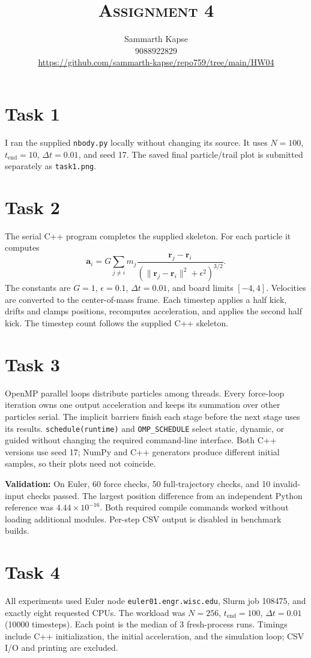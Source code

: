 \documentclass[a4paper]{article}
\title{\textsc{Assignment 4}}
\author{Sammarth Kapse \\ 9088922829 \\
\url{https://github.com/sammarth-kapse/repo759/tree/main/HW04}}
\date{}
\begin{document}
\maketitle

\section*{Task 1}
I ran the supplied \texttt{nbody.py} locally without changing its source. It uses
$N=100$, $t_{\mathrm{end}}=10$, $\Delta t=0.01$, and seed 17. The saved final
particle/trail plot is submitted separately as \texttt{task1.png}.

\section*{Task 2}
The serial C++ program completes the supplied skeleton. For each particle it computes
\[
 \mathbf a_i=G\sum_{j\ne i}m_j
 \frac{\mathbf r_j-\mathbf r_i}
 {(\|\mathbf r_j-\mathbf r_i\|^2+\epsilon^2)^{3/2}}.
\]
The constants are $G=1$, $\epsilon=0.1$, $\Delta t=0.01$, and board limits $[-4,4]$.
Velocities are converted to the center-of-mass frame. Each timestep applies a half kick,
drifts and clamps positions, recomputes acceleration, and applies the second half kick.
The timestep count follows the supplied C++ skeleton.

\section*{Task 3}
OpenMP parallel loops distribute particles among threads. Every force-loop iteration
owns one output acceleration and keeps its summation over other particles serial.
The implicit barriers finish each stage before the next stage uses its results.
\texttt{schedule(runtime)} and \texttt{OMP\_SCHEDULE} select static, dynamic, or guided
without changing the required command-line interface. Both C++ versions use seed 17;
NumPy and C++ generators produce different initial samples, so their plots need not coincide.

\textbf{Validation:} On Euler, 60 force checks, 50 full-trajectory checks, and 10 invalid-input checks passed. The largest position difference from an independent Python reference was $4.44\times 10^{-16}$. Both required compile commands worked without loading additional modules. Per-step CSV output is disabled in benchmark builds.
\newpage
\section*{Task 4}
All experiments used Euler node \texttt{euler01.engr.wisc.edu}, Slurm job 108475, and exactly eight requested CPUs. The workload was $N=256$, $t_{\mathrm{end}}=100$, $\Delta t=0.01$ (10000 timesteps). Each point is the median of 3 fresh-process runs. Timings include C++ initialization, the initial acceleration, and the simulation loop; CSV I/O and printing are excluded.
\end{document}
